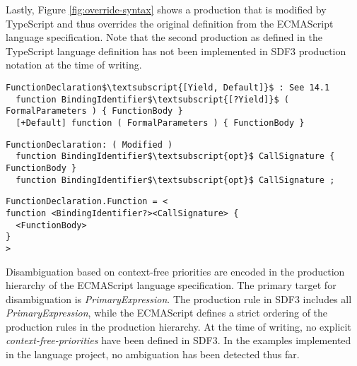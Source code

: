 Lastly, Figure \ref{fig:override-syntax} shows a production that is modified by TypeScript and thus overrides the original definition from the ECMAScript language specification.
Note that the second production as defined in the TypeScript language definition has not been implemented in SDF3 production notation at the time of writing.

\begin{figure*}
  \begin{lstlisting}[caption=Definition of \textit{FunctionDeclaration} in the ECMAScript language specification,mathescape]
FunctionDeclaration$\textsubscript{[Yield, Default]}$ : See 14.1
  function BindingIdentifier$\textsubscript{[?Yield]}$ ( FormalParameters ) { FunctionBody }
  [+Default] function ( FormalParameters ) { FunctionBody }
  \end{lstlisting}
  \begin{lstlisting}[caption=Definition of \textit{FunctionDeclaration} in the TypeScript language specification,mathescape]
FunctionDeclaration: ( Modified )
  function BindingIdentifier$\textsubscript{opt}$ CallSignature { FunctionBody }
  function BindingIdentifier$\textsubscript{opt}$ CallSignature ;
  \end{lstlisting}
  \begin{lstlisting}[caption=Definition of \textit{FunctionDeclaration} in SDF3 production notation]
FunctionDeclaration.Function = <
function <BindingIdentifier?><CallSignature> {
  <FunctionBody>
}
>
  \end{lstlisting}
  \caption{The translation of \textit{FunctionDeclaration} from both the ECMAScript and TypeScript language specifications to SDF3 production notation.}
  \label{fig:override-syntax}
\end{figure*}

Disambiguation based on context-free priorities are encoded in the production hierarchy of the ECMAScript language specification.
The primary target for disambiguation is \textit{PrimaryExpression}.
The production rule in SDF3 includes all \textit{PrimaryExpression}, while the ECMAScript defines a strict ordering of the production rules in the production hierarchy.
At the time of writing, no explicit \textit{context-free-priorities} have been defined in SDF3.
In the examples implemented in the language project, no ambiguation has been detected thus far.
